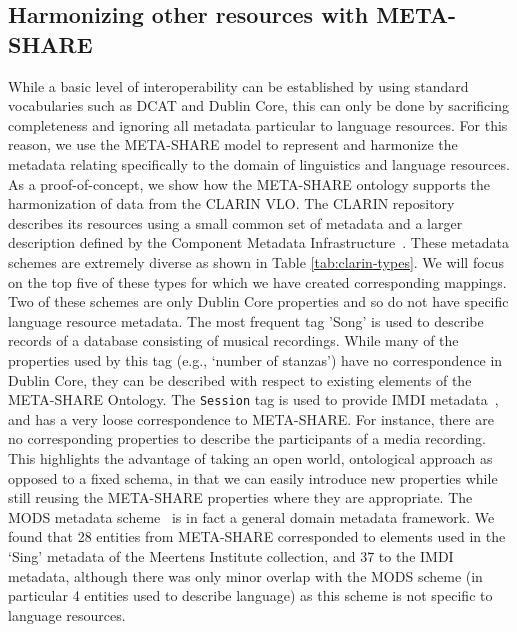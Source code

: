 \documentclass{llncs}
\begin{document}
\subsection{Harmonizing other resources with META-SHARE}
\label{sec:harmonization}
While a basic level of interoperability can be established by using standard
vocabularies such as DCAT and Dublin Core, this can only be done by sacrificing
completeness and ignoring all metadata particular to language resources. For
this reason, we use the META-SHARE model to represent and harmonize the metadata
relating specifically to the domain of linguistics and language resources. As a
proof-of-concept, we show how the META-SHARE ontology supports the harmonization
of data from the CLARIN VLO. The
CLARIN repository describes its resources using a small common set of metadata
and a larger description defined by the Component Metadata
Infrastructure~\cite[CMDI]{broeder2012cmdi}. These metadata schemes are
extremely diverse as shown in Table \ref{tab:clarin-types}.
We will focus on the
top five of these types for which we have created corresponding mappings. Two of these schemes are only Dublin Core properties and so do not have
specific language resource metadata. The most frequent tag 'Song' is used to describe records of a 
database consisting of musical recordings. While many of the properties used by this tag (e.g., `number of
stanzas') have no correspondence in Dublin Core, they can be described with respect to existing elements of the META-SHARE Ontology.
The {\tt Session} tag is used to provide IMDI metadata~\cite{broeder2001imdi}, and has a very loose correspondence to META-SHARE. For instance, there are no corresponding properties to describe the participants of a media recording.
This highlights the advantage of
taking an open world, ontological approach as opposed to a fixed schema, in that
we can easily introduce new properties while still reusing the META-SHARE properties
where they are appropriate.
The MODS metadata
scheme~\cite{gartner2003mods} is in fact a general domain metadata framework.
We found that 28 entities from META-SHARE
corresponded to elements used in the `Sing' metadata of the Meertens Institute collection, and 37 to the IMDI metadata,
although there was only minor overlap with the MODS scheme (in particular 4
entities used to describe language) as this scheme is not specific to language
resources.
\end{document}
